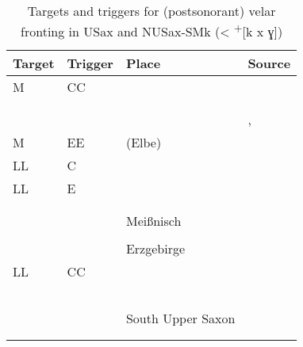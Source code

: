 \begin{table}
\caption{Targets and triggers for (postsonorant) velar fronting in USax and NUSax-SMk (< \textsuperscript{+}[k x ɣ])\label{tab:12.11}}
\begin{tabularx}{\textwidth}{llQQ}
\lsptoprule
Target & Trigger & Place & Source\\
\midrule
M & CC &        & \citet{Schönfeld1958}                \\
  &    &             &\citet{Seibicke1967}                 \\
  &    &                  &\citet{Stellmacher1973}              \\
  &    &                   &\citet{Schönfeld1986}, \citet{BethgeBonnin1969}\\
M & EE &   (Elbe) & \citet{Bischoff1935}\\
LL & C &   & \citet{Bergmann1965}\\
LL & E &        & \citet{Albrecht1983}  \\
   &   &          & \citet{Philipp1897}    \\
   &   &        & \citet{Lang1906}       \\
   &   &Meißnisch            & \citet{Große1955}      \\
   &   &          & \citet{Fleischer1961}  \\
   &   &Erzgebirge           & \citet{Goepfert1878}\\
LL & CC &                 & \citet{Hertel1887}    \\
   &   &                      &\citet{Hausenblas1898}  \\
   &   &                 &\citet{Goessgen1902}    \\
   &   &                   &\citet{Pompé1907}       \\
   &   &         &\citet{Hausenblas1914}  \\
   &   &              &\citet{Protze1957}      \\
   &   &South Upper Saxon             &\citet{Becker1969}      \\
   &   &                &\citet{Langner1977}\\
\lspbottomrule
\end{tabularx}
\end{table}

